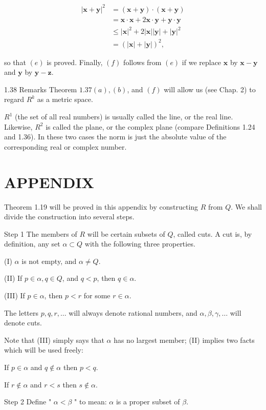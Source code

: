 \documentclass[10pt]{article}
\begin{document}
$$
\begin{aligned}
|\mathbf{x}+\mathbf{y}|^{2} & =(\mathbf{x}+\mathbf{y}) \cdot(\mathbf{x}+\mathbf{y}) \\
& =\mathbf{x} \cdot \mathbf{x}+2 \mathbf{x} \cdot \mathbf{y}+\mathbf{y} \cdot \mathbf{y} \\
& \leq|\mathbf{x}|^{2}+2|\mathbf{x}||\mathbf{y}|+|\mathbf{y}|^{2} \\
& =(|\mathbf{x}|+|\mathbf{y}|)^{2},
\end{aligned}
$$

so that $(e)$ is proved. Finally, $(f)$ follows from $(e)$ if we replace $\mathbf{x}$ by $\mathbf{x}-\mathbf{y}$ and $\mathbf{y}$ by $\mathbf{y}-\mathbf{z}$.

1.38 Remarks Theorem $1.37(a),(b)$, and $(f)$ will allow us (see Chap. 2) to regard $R^{k}$ as a metric space.

$R^{1}$ (the set of all real numbers) is usually called the line, or the real line. Likewise, $R^{2}$ is called the plane, or the complex plane (compare Definitions 1.24 and 1.36). In these two cases the norm is just the absolute value of the corresponding real or complex number.

\section{APPENDIX}
Theorem 1.19 will be proved in this appendix by constructing $R$ from $Q$. We shall divide the construction into several steps.

Step 1 The members of $R$ will be certain subsets of $Q$, called cuts. A cut is, by definition, any set $\alpha \subset Q$ with the following three properties.

(I) $\alpha$ is not empty, and $\alpha \neq Q$.

(II) If $p \in \alpha, q \in Q$, and $q<p$, then $q \in \alpha$.

(III) If $p \in \alpha$, then $p<r$ for some $r \in \alpha$.

The letters $p, q, r, \ldots$ will always denote rational numbers, and $\alpha, \beta, \gamma, \ldots$ will denote cuts.

Note that (III) simply says that $\alpha$ has no largest member; (II) implies two facts which will be used freely:

If $p \in \alpha$ and $q \notin \alpha$ then $p<q$.

If $r \notin \alpha$ and $r<s$ then $s \notin \alpha$.

Step 2 Define " $\alpha<\beta$ " to mean: $\alpha$ is a proper subset of $\beta$.
\end{document}

